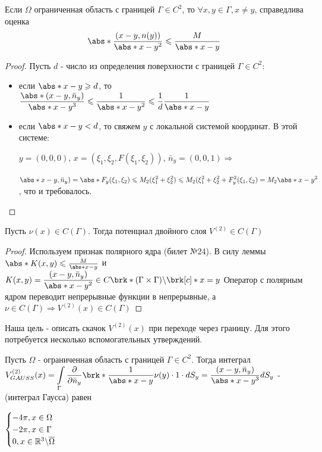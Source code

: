 \begin{lemma}
Если $\Omega$ ограниченная область с границей $\Gamma \in C^2$, то $\forall x,y\in\Gamma, x\neq y$, справедлива оценка $$\abs*{\frac{(x-y,n(y))}{\abs*{x-y}^2}}\leq\frac{M}{\abs*{x-y}}$$
\end{lemma}
\begin{proof}
Пусть $d$ - число из определения поверхности с границей $\Gamma \in C^2$:
\begin{itemize}[noitemsep]
\item если $\displaystyle  \abs*{x-y}\geq d$, то $\displaystyle \frac{\abs*{(x-y,\bar{n}_y)}}{\abs*{x-y}^3} \leq \frac{1}{\abs*{x-y}^2} \leq \frac{1}{d}\frac{1}{\abs*{x-y}}$
\item если $\abs*{x-y} < d$, то свяжем $y$ с локальной системой координат. В этой системе: 
\

$\displaystyle y=(0,0,0)$, $x = (\xi_1,\xi_2, F(\xi_1, \xi_2))$, $\bar{n}_y = (0,0,1) \Rightarrow$
\

 $\displaystyle \abs*{x-y, \bar{n}_y)} = \abs*{F_y(\xi_1, \xi_2)} \leq M_2(\xi_1^2+\xi_2^2)\leq M_2(\xi_1^2+\xi_2^2 + F_y^2(\xi_1, \xi_2) = M_2\abs*{x-y}^2$, что и требовалось.
\end{itemize}
\end{proof}
\begin{lemma}
Пусть $\nu(x) \in C(\Gamma)$. Тогда потенциал двойного слоя $V^{(2)} \in C(\Gamma)$
\end{lemma}

\begin{proof}
Используем признак полярного ядра (билет №24). В силу леммы $\abs*{K(x,y)} \leq \frac{M}{\abs*{x-y}}$ и 
\
$K(x,y) = \displaystyle \frac{(x-y, \bar{n}_y)}{\abs*{x-y}^2}\in C\brk*{(\Gamma\times\Gamma)\backslash \brk[c]*{x=y}}$
Оператор с полярным ядром переводит непрерывные функции в непрерывные, а $\nu \in C(\Gamma) \Rightarrow V^{(2)}(x)\in C(\Gamma)$

\end{proof}
Наша цель - описать скачок $V^{(2)}(x)$ при переходе через границу. Для этого потребуется несколько вспомогательных утверждений.
\begin{lemma}
Пусть $\Omega$ - ограниченная область с границей $\Gamma\in C^2$. Тогда интеграл $\displaystyle V^{(2)}_{GAUSS}(x) = 
\int\limits_{\Gamma} \frac{\partial}{\partial\bar{n}_y}\brk*{\frac{1}{\abs*{x-y}}}\nu(y) \cdot 1 \cdot dS_y = \dfrac{(x-y, \bar{n}_y)}{\abs*{x-y}^3} dS_y$ - (интеграл Гаусса) равен 

$\begin{cases} -4\pi, x\in \Omega \\
-2\pi, x\in \Gamma \\ 0, x\in\mathbb{R}^3\backslash \overline{\Omega}
\end{cases}$
\end{lemma}

